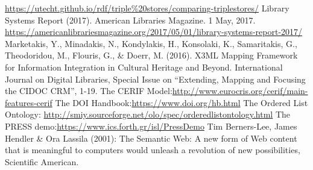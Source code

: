 \documentclass[runningheads,a4paper]{llncs}
\begin{document}
\begin{thebibliography}{4}

 \url{https://utecht.github.io/rdf/triple\%20stores/comparing-triplestores/}
 Library Systems Report (2017). American Libraries Magazine. 1 May, 2017. \url{https://americanlibrariesmagazine.org/2017/05/01/library-systems-report-2017/}
 Marketakis, Y., Minadakis, N., Kondylakis, H., Konsolaki, K., Samaritakis, G., Theodoridou, M., Flouris, G., \& Doerr, M. (2016). X3ML Mapping Framework for Information Integration in Cultural Heritage and Beyond. International Journal on Digital Libraries, Special Issue on ``Extending, Mapping and Focusing the CIDOC CRM'', 1-19.
 The CERIF Model:\url{http://www.eurocris.org/cerif/main-features-cerif}
 The DOI Handbook:\url{https://www.doi.org/hb.html}
 The Ordered List Ontology: \url{http://smiy.sourceforge.net/olo/spec/orderedlistontology.html}
 The PRESS demo:\url{https://www.ics.forth.gr/isl/PressDemo}
 Tim Berners-Lee, James Hendler \& Ora Lassila (2001): The Semantic Web: A new form of Web content that is meaningful to computers would unleash a revolution of new possibilities, Scientific American.

\end{thebibliography}
\end{document}
